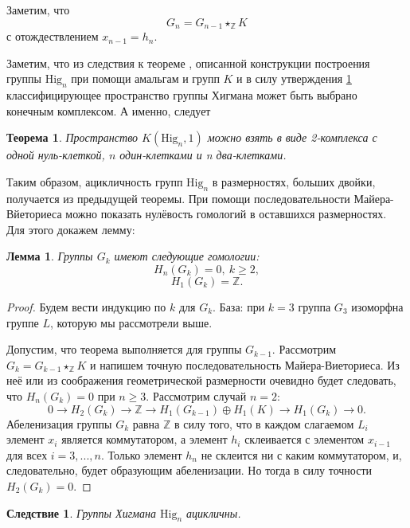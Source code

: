 \documentclass[14pt, dvipsnames]{extarticle}
\newtheorem{theorem}{Теорема}
\newtheorem{lemma}{Лемма}
\newtheorem{corollary}{Следствие}[theorem]
\theoremstyle{definition}
\theoremstyle{remark}
\begin{document}
Заметим, что $$G_n=G_{n-1}\star_\mathbb{Z} K$$ с отождествлением $x_{n-1}=h_n$.






Заметим, что из следствия к теореме \cite{Vasquez}, описанной конструкции построения группы $\mathrm{Hig}_n$ при помощи амальгам и групп $K$ и в силу утверждения \ref{finite} классифицирующее пространство группы Хигмана может быть выбрано конечным комплексом. А именно, следует

\begin{theorem}\label{finite}
Пространство $K(\mathrm{Hig}_n, 1)$ можно взять в виде 2-комплекса с одной нуль-клеткой, $n$ один-клетками и n два-клетками.
\end{theorem}

Таким образом, ацикличность групп $\mathrm{Hig}_n$ в размерностях, больших двойки, получается из предыдущей теоремы. При помощи последовательности Майера-Вйеториеса можно показать нулёвость гомологий в оставшихся размерностях. Для этого докажем лемму:
 



\begin{lemma}
Группы $G_k$ имеют следующие гомологии: $$H_n(G_k)=0,\ k\geqslant 2,$$ $$H_1(G_k)=\mathbb{Z}.$$ 
\end{lemma}

\begin{proof}
Будем вести индукцию по $k$ для $G_k$. База: при $k=3$ группа $G_3$ изоморфна группе $L$, которую мы рассмотрели выше.

Допустим, что теорема выполняется для группы $G_{k-1}$. Рассмотрим $G_k=G_{k-1}\star_{\mathbb{Z}}K$ и напишем точную последовательность Майера-Виеториеса. Из неё или из соображения геометрической размерности очевидно будет следовать, что $H_n(G_k)=0$ при $n\geqslant 3$. Рассмотрим случай $n=2$: $$0\to H_2(G_k)\to \mathbb{Z}\to H_1(G_{k-1})\oplus H_1(K)\to H_1(G_k)\to 0.$$ Абеленизация группы $G_k$ равна $\mathbb{Z}$ в силу того, что в каждом слагаемом $L_i$ элемент $x_i$ является коммутатором, а элемент $h_i$ склеивается с элементом $x_{i-1}$ для всех $i=3, ..., n$. Только элемент $h_n$ не склеится ни с каким коммутатором, и, следовательно, будет образующим абеленизации. Но тогда в силу точности $H_2(G_k)=0$.   
\end{proof}

\begin{corollary}
Группы Хигмана $\mathrm{Hig}_n$ ацикличны.
\end{corollary}
\end{document}
